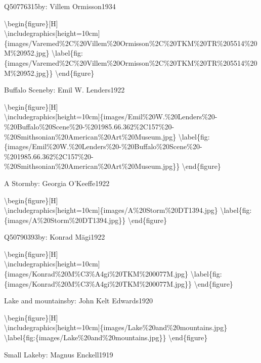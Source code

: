 \documentclass[
  a4paper,
]{book}
\begin{document}
\label{http:ux2fux2fwww.wikidata.orgux2fentityux2fQ50776315}
Q50776315by: Villem Ormisson1934

\textbackslash begin\{figure\}{[}H{]}\\
\textbackslash includegraphics{[}height=10cm{]}\{images/Varemed\%2C\%20Villem\%20Ormisson\%2C\%20TKM\%20TR\%205514\%20M\%20952.jpg\}
\textbackslash label\{fig:\{images/Varemed\%2C\%20Villem\%20Ormisson\%2C\%20TKM\%20TR\%205514\%20M\%20952.jpg\}\}
\textbackslash end\{figure\}

\label{http:ux2fux2fwww.wikidata.orgux2fentityux2fQ20491060}
Buffalo Sceneby: Emil W. Lenders1922

\textbackslash begin\{figure\}{[}H{]}\\
\textbackslash includegraphics{[}height=10cm{]}\{images/Emil\%20W.\%20Lenders\%20-\%20Buffalo\%20Scene\%20-\%201985.66.362\%2C157\%20-\%20Smithsonian\%20American\%20Art\%20Museum.jpg\}
\textbackslash label\{fig:\{images/Emil\%20W.\%20Lenders\%20-\%20Buffalo\%20Scene\%20-\%201985.66.362\%2C157\%20-\%20Smithsonian\%20American\%20Art\%20Museum.jpg\}\}
\textbackslash end\{figure\}

\label{http:ux2fux2fwww.wikidata.orgux2fentityux2fQ20191641}
A Stormby: Georgia O'Keeffe1922

\textbackslash begin\{figure\}{[}H{]}\\
\textbackslash includegraphics{[}height=10cm{]}\{images/A\%20Storm\%20DT1394.jpg\}
\textbackslash label\{fig:\{images/A\%20Storm\%20DT1394.jpg\}\}
\textbackslash end\{figure\}

\label{http:ux2fux2fwww.wikidata.orgux2fentityux2fQ50790393}
Q50790393by: Konrad Mägi1922

\textbackslash begin\{figure\}{[}H{]}\\
\textbackslash includegraphics{[}height=10cm{]}\{images/Konrad\%20M\%C3\%A4gi\%20TKM\%200077M.jpg\}
\textbackslash label\{fig:\{images/Konrad\%20M\%C3\%A4gi\%20TKM\%200077M.jpg\}\}
\textbackslash end\{figure\}

\label{http:ux2fux2fwww.wikidata.orgux2fentityux2fQ64686030}
Lake and mountainsby: John Kelt Edwards1920

\textbackslash begin\{figure\}{[}H{]}\\
\textbackslash includegraphics{[}height=10cm{]}\{images/Lake\%20and\%20mountains.jpg\}
\textbackslash label\{fig:\{images/Lake\%20and\%20mountains.jpg\}\}
\textbackslash end\{figure\}

\label{http:ux2fux2fwww.wikidata.orgux2fentityux2fQ20795141}
Small Lakeby: Magnus Enckell1919
\end{document}
